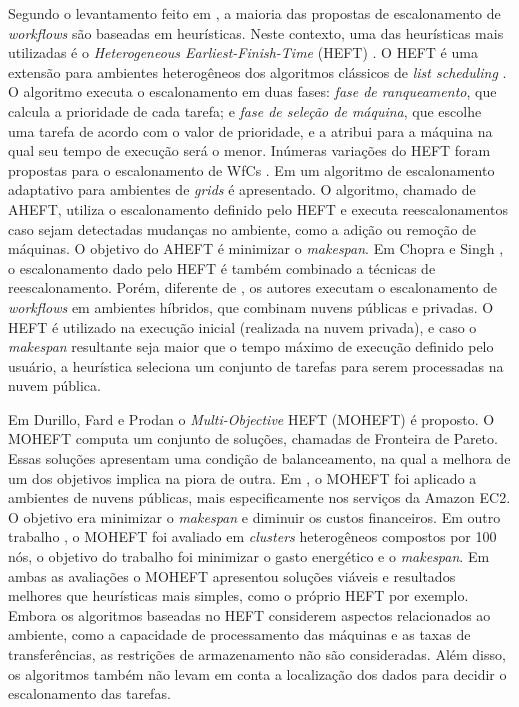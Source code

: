 Segundo o levantamento feito em \cite{Masdari16}, a maioria das propostas de escalonamento de \textit{workflows} são baseadas em heurísticas. Neste contexto, uma das heurísticas mais utilizadas é o \textit{Heterogeneous Earliest-Finish-Time} (HEFT) \cite{HEFT}. O HEFT é uma extensão   para ambientes heterogêneos dos algoritmos clássicos de \textit{list scheduling} \cite{SCHUTTEN96}. O algoritmo executa o escalonamento em duas fases: \textit{fase de ranqueamento}, que calcula a prioridade de cada tarefa; e \textit{fase de seleção de máquina}, que escolhe uma tarefa de acordo com o valor de prioridade, e a atribui para a máquina na qual seu tempo de execução será o menor. Inúmeras variações do HEFT foram propostas para o escalonamento de WfCs \cite{Yu07,chopra13, durillo12, Durillo14}. Em \cite{Yu07} um algoritmo de escalonamento adaptativo para ambientes de \textit{grids} é apresentado. O algoritmo, chamado de AHEFT, utiliza o escalonamento definido pelo HEFT e executa reescalonamentos caso sejam detectadas mudanças no ambiente, como a adição ou remoção de máquinas. O objetivo do AHEFT é minimizar o \textit{makespan}. Em Chopra e Singh \cite{chopra13}, o escalonamento dado pelo HEFT é também combinado a técnicas de reescalonamento. Porém, diferente de \cite{Yu07}, os autores executam o escalonamento de \textit{workflows} em ambientes híbridos, que combinam nuvens públicas e privadas. O HEFT é utilizado na execução inicial (realizada na nuvem privada), e caso o \textit{makespan} resultante seja maior que o tempo máximo de execução definido pelo usuário, a heurística seleciona um conjunto de tarefas para serem processadas na nuvem pública. 

Em Durillo, Fard e Prodan \cite{durillo12} o \textit{Multi-Objective} HEFT (MOHEFT) é proposto. O MOHEFT computa um conjunto de soluções, chamadas de Fronteira de Pareto. Essas soluções apresentam uma condição de balanceamento, na qual a melhora de um dos objetivos implica na piora de outra. Em \cite{durillo12}, o MOHEFT foi aplicado a ambientes de nuvens públicas, mais especificamente nos serviços da Amazon EC2. O objetivo era minimizar o \textit{makespan} e diminuir os custos financeiros. Em outro trabalho \cite{Durillo14}, o MOHEFT foi avaliado em \textit{clusters} heterogêneos compostos por 100 nós, o objetivo do trabalho foi minimizar o gasto energético e o \textit{makespan}. Em ambas as avaliações o MOHEFT apresentou soluções viáveis e resultados melhores que heurísticas mais simples, como o próprio HEFT por exemplo. Embora os algoritmos baseadas no HEFT considerem aspectos relacionados ao ambiente, como a capacidade de processamento das máquinas e as taxas de transferências, as restrições de armazenamento não são consideradas. Além disso, os algoritmos também não levam em conta a localização dos dados para decidir o escalonamento das tarefas.

